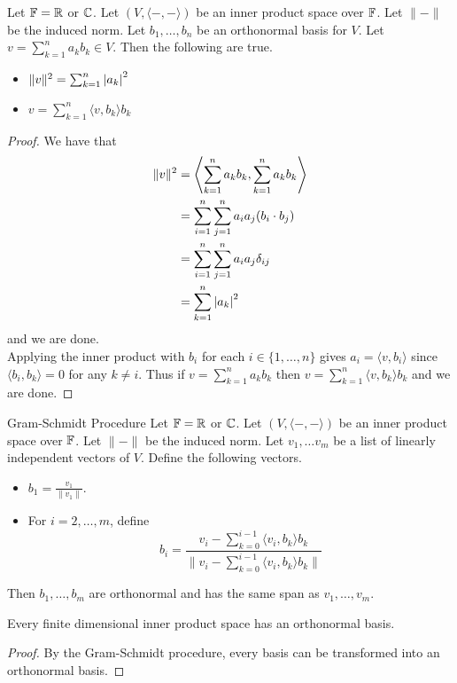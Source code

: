 \documentclass[a4paper]{article}
\begin{document}
\begin{prp}{}{} Let $\mathbb{F}=\mathbb{R}$ or $\mathbb{C}$. Let $(V,\langle-,-\rangle)$ be an inner product space over $\mathbb{F}$. Let $\|-\|$ be the induced norm. Let $b_1,\dots,b_n$ be an orthonormal basis for $V$. Let $v=\sum_{k=1}^na_kb_k\in V$. Then the following are true. 
\begin{itemize}
\item $\|v\|^2=\sum_{k=1}^n\abs{a_k}^2$
\item $v=\sum_{k=1}^n\langle v,b_k\rangle b_k$
\end{itemize} 
\begin{proof}
We have that 
\begin{align*}
\|v\|^2&=\left\langle\sum_{k=1}^na_kb_k, \sum_{k=1}^na_kb_k\right\rangle \\
&=\sum_{i=1}^n\sum_{j=1}^na_ia_j(b_i\cdot b_j)\\
&=\sum_{i=1}^n\sum_{j=1}^na_ia_j\delta_{ij}\\
&=\sum_{k=1}^n\abs{a_k}^2
\end{align*}
and we are done. \\

Applying the inner product with $b_i$ for each $i\in\{1,\dots,n\}$ gives $a_i=\langle v,b_i\rangle$ since $\langle b_i,b_k\rangle=0$ for any $k\neq i$. Thus if $v=\sum_{k=1}^na_kb_k$ then $v=\sum_{k=1}^n\langle v,b_k\rangle b_k$ and we are done. 
\end{proof}
\end{prp}

\begin{thm}{Gram-Schmidt Procedure}{} Let $\mathbb{F}=\mathbb{R}$ or $\mathbb{C}$. Let $(V,\langle-,-\rangle)$ be an inner product space over $\mathbb{F}$. Let $\|-\|$ be the induced norm. Let $v_1,\dots v_m$ be a list of linearly independent vectors of $V$. Define the following vectors. 
\begin{itemize}
\item $b_1=\frac{v_1}{\|v_1\|}$. 
\item For $i=2,\dots,m$, define $$b_i=\frac{v_i-\sum_{k=0}^{i-1}\langle v_i,b_k\rangle b_k}{\|v_i-\sum_{k=0}^{i-1}\langle v_i,b_k\rangle b_k\|}$$
\end{itemize}
Then $b_1,\dots,b_m$ are orthonormal and has the same span as $v_1,\dots,v_m$. 
\end{thm}

\begin{crl}{}{} Every finite dimensional inner product space has an orthonormal basis. 
\begin{proof}
By the Gram-Schmidt procedure, every basis can be transformed into an orthonormal basis. 
\end{proof}
\end{crl}
\end{document}
